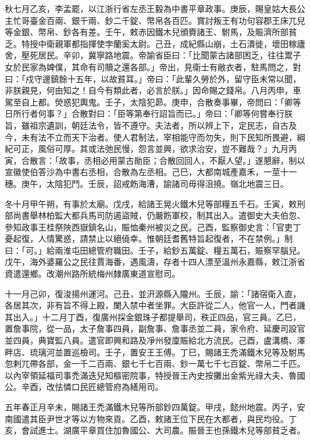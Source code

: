 \begin{pinyinscope}
 秋七月乙亥，李孟罷，以江浙行省左丞王毅為中書平章政事。庚辰，賜皇姑大長公主忙哥臺金百兩、銀千兩、鈔二千錠、幣帛各百匹。賞討叛王有功句容郡王床兀兒等金銀、幣帛、鈔各有差。壬午，敕赤因鐵木兒頒賚諸王、駙馬，及賑濟所部貧乏。特授中衛親軍都指揮使孛蘭奚太尉。己丑，成紀縣山崩，土石潰徙，壞田稼廬舍，壓死居民。辛卯，冀寧路地震。帝諭省臣曰：「比聞蒙古諸部困乏，往往鬻子女於民家為婢僕，其命有司贖之還各部。」帝出，見衛士有敝衣者，駐馬問之，對曰：「戍守邊鎮餘十五年，以故貧耳。」帝曰：「此輩久勞於外，留守臣未常以聞，非朕親見，何由知之！自今有類此者，必言於朕。」因命賜之錢帛。八月丙申，車駕至自上都。熒惑犯輿鬼。壬子，太陰犯昴。庚申，合散奏事畢，帝問曰：「卿等日所行者何事？」合散對曰：「臣等第奉行詔旨而已。」帝曰：「卿等何嘗奉行朕旨，雖祖宗遺訓，朝廷法令，皆不遵守。夫法者，所以辨上下，定民志，自古及今，未有法不立而天下治者。使人君制法，宰相能守而勿失，則下民知所畏避，綱紀可正，風俗可厚。其或法弛民慢，怨言並興，欲求治安，豈不難哉？」九月丙寅，合散言：「故事，丞相必用蒙古勛臣；合散回回人，不厭人望。」遂懇辭，制以宣徽使伯答沙為中書右丞相，合散為左丞相。己巳，大都南城產嘉禾，一莖十一穗。庚午，太陰犯鬥。壬辰，詔戒飭海漕，諭諸司毋得沮撓。嶺北地震三日。



 冬十月甲午朔，有事於太廟。戊戌，給諸王晃火鐵木兒等部糧五千石。壬寅，敕刑部尚書舉林柏監大都兵馬司防遏盜賊，仍嚴飭軍校，制其出入。遣御史大夫伯忽、參知政事王桂祭陜西嶽鎮名山，賑恤秦州被災之民。己酉，監察御史言：「官吏丁憂起復，人情驚惑，請禁止以絕僥幸。惟朝廷耆舊特旨起復者，不在禁例。」制曰：「可。」給兩淮屯田總管府職田。壬子，給鈔五萬錠、糧五萬石，賑察罕腦兒。戊午，海外婆羅公之民往賈海番，遇風濤，存者十四人漂至溫州永嘉縣，敕江浙省資遣還鄉。改潮州路所統梅州隸廣東道宣慰司。



 十一月己卯，復浚揚州運河。己丑，並汧源縣入隴州。壬辰，諭：「諸宿衛入直，各居其次，非有旨不得上殿，闌入禁中者坐罪。大臣許從二人，他官一人，門者譏其出入。」十二月丁酉，復廣州採金銀珠子都提舉司，秩正四品，官三員。乙巳，置詹事院，從一品，太子詹事四員，副詹事、詹事丞並二員，家令府、延慶司設官並四員，典寶監八員。遣官即興和路及凈州發廩賑給北方流民。己酉，盧溝橋、澤畔店、琉璃河並置巡檢司。壬子，置安王王傅。丁巳，賜諸王禿滿鐵木兒等及駙馬忽剌兀帶各部，金一千二百兩、銀七千七百兩、鈔一萬七千七百錠、幣帛二千匹。以內宰領延福司事禿滿迭兒知樞密院事，特授晉王內史按攤出金紫光祿大夫、魯國公。辛酉，改怯憐口民匠總管府為繕用司。



 五年春正月辛未，賜諸王禿滿鐵木兒等所部鈔四萬錠。甲戌，懿州地震。丙子，安南國遣其臣尹世才等以方物來貢。乙酉，敕諸王位下民在大都者，與民均役。丁亥，會試進士。湖廣平章買住加魯國公、大司農。賑晉王也孫鐵木兒等部貧乏者。




\end{pinyinscope}
